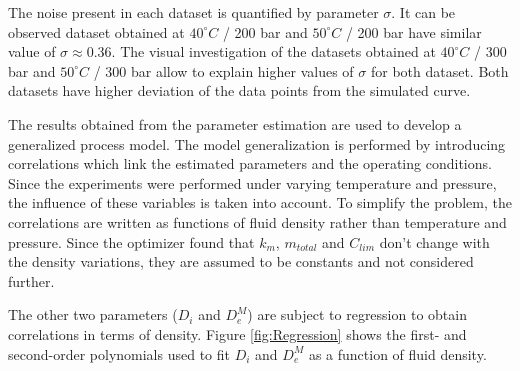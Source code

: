 \documentclass[../Article_Model_Parameters.tex]{subfiles}
\begin{document}
	The noise present in each dataset is quantified by parameter $\sigma$. It can be observed dataset obtained at $40 ^\circ C$ / 200 bar and $50 ^\circ C$ / 200 bar have similar value of $\sigma\approx0.36$. The visual investigation of the datasets obtained at $40 ^\circ C$ / 300 bar and $50 ^\circ C$ / 300 bar allow to explain higher values of $\sigma$ for both dataset. Both datasets have higher deviation of the data points from the simulated curve.

	The results obtained from the parameter estimation are used to develop a generalized process model. The model generalization is performed by introducing correlations which link the estimated parameters and the operating conditions. Since the experiments were performed under varying temperature and pressure, the influence of these variables is taken into account. To simplify the problem, the correlations are written as functions of fluid density rather than temperature and pressure. Since the optimizer found that $k_m$, $m_{total}$ and $C_{lim}$ don't change with the density variations, they are assumed to be constants and not considered further.
		
	The other two parameters ($D_i$ and $D_e^M$) are subject to regression to obtain correlations in terms of density. Figure \ref{fig:Regression} shows the first- and second-order polynomials used to fit $D_i$ and $D_e^M$ as a function of fluid density. 
	

	
	
\end{document}
